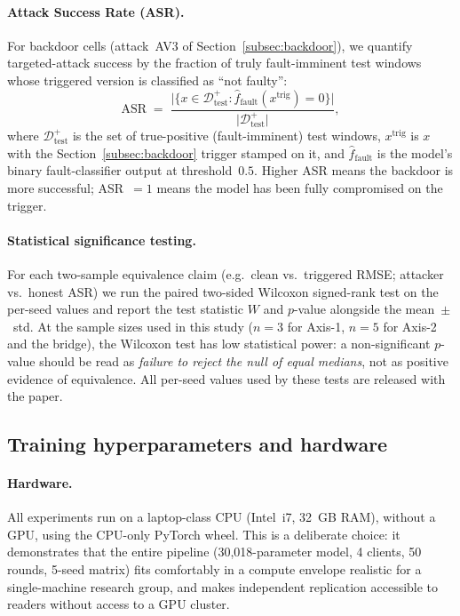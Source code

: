 \documentclass[preprint,12pt,authoryear]{elsarticle}
\begin{document}
\paragraph{Attack Success Rate (ASR).}
For backdoor cells (attack~AV3 of
Section~\ref{subsec:backdoor}), we quantify targeted-attack success
by the fraction of truly fault-imminent test windows whose triggered
version is classified as ``not faulty'':
\begin{equation}
    \mathrm{ASR}
    \;=\; \frac{\bigl|\{ x \in \mathcal{D}_{\text{test}}^{+} : \hat{f}_{\mathrm{fault}}(x^{\text{trig}}) = 0 \}\bigr|}
                {\bigl|\mathcal{D}_{\text{test}}^{+}\bigr|},
    \label{eq:asr}
\end{equation}
where $\mathcal{D}_{\text{test}}^{+}$ is the set of true-positive
(fault-imminent) test windows, $x^{\text{trig}}$ is $x$ with the
Section~\ref{subsec:backdoor} trigger stamped on it, and
$\hat{f}_{\mathrm{fault}}$ is the model's binary fault-classifier
output at threshold~$0.5$. Higher ASR means the backdoor is more
successful; ASR~$= 1$ means the model has been fully compromised on
the trigger.

\paragraph{Statistical significance testing.}
For each two-sample equivalence claim (e.g.\ clean vs.\ triggered
RMSE; attacker vs.\ honest ASR) we run the paired two-sided
Wilcoxon signed-rank test on the per-seed values and report the
test statistic $W$ and $p$-value alongside the mean~$\pm$~std.
At the sample sizes used in this study ($n = 3$ for Axis-1,
$n = 5$ for Axis-2 and the bridge), the Wilcoxon test has low
statistical power: a non-significant $p$-value should be read as
\emph{failure to reject the null of equal medians}, not as
positive evidence of equivalence. All per-seed values used by
these tests are released with the paper.

\subsection{Training hyperparameters and hardware}
\label{subsec:hyperparams}

\paragraph{Hardware.}
All experiments run on a laptop-class CPU (Intel~i7, 32~GB RAM),
without a GPU, using the CPU-only PyTorch wheel. This is a
deliberate choice: it demonstrates that the entire pipeline
(30{,}018-parameter model, 4 clients, 50 rounds, 5-seed matrix)
fits comfortably in a compute envelope realistic for a single-machine
research group, and makes independent replication accessible to
readers without access to a GPU cluster.
\end{document}
